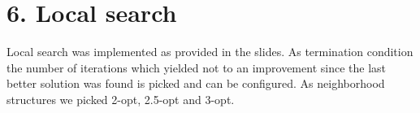 \section*{6. Local search}
Local search was implemented as provided in the slides. As termination condition the number of iterations which yielded not to an improvement since the last better solution was found is picked and can be configured. As neighborhood structures we picked 2-opt, 2.5-opt and 3-opt.